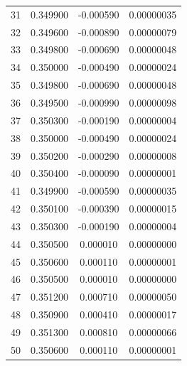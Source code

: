 \begin{tabular}{|c|c|c|c|}
31 & 0.349900 & -0.000590 & 0.00000035 \\
32 & 0.349600 & -0.000890 & 0.00000079 \\
33 & 0.349800 & -0.000690 & 0.00000048 \\
34 & 0.350000 & -0.000490 & 0.00000024 \\
35 & 0.349800 & -0.000690 & 0.00000048 \\
36 & 0.349500 & -0.000990 & 0.00000098 \\
37 & 0.350300 & -0.000190 & 0.00000004 \\
38 & 0.350000 & -0.000490 & 0.00000024 \\
39 & 0.350200 & -0.000290 & 0.00000008 \\
40 & 0.350400 & -0.000090 & 0.00000001 \\
41 & 0.349900 & -0.000590 & 0.00000035 \\
42 & 0.350100 & -0.000390 & 0.00000015 \\
43 & 0.350300 & -0.000190 & 0.00000004 \\
44 & 0.350500 & 0.000010 & 0.00000000 \\
45 & 0.350600 & 0.000110 & 0.00000001 \\
46 & 0.350500 & 0.000010 & 0.00000000 \\
47 & 0.351200 & 0.000710 & 0.00000050 \\
48 & 0.350900 & 0.000410 & 0.00000017 \\
49 & 0.351300 & 0.000810 & 0.00000066 \\
50 & 0.350600 & 0.000110 & 0.00000001 \\
\hline
\end{tabular}
